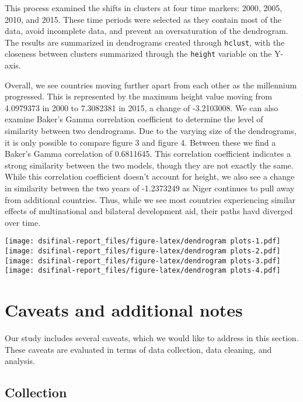 \documentclass[
]{article}
\begin{document}
This process examined the shifts in clusters at four time markers: 2000,
2005, 2010, and 2015. These time periods were selected as they contain
most of the data, avoid incomplete data, and prevent an oversaturation
of the dendrogram. The results are summarized in dendrograms created
through \texttt{hclust}, with the closeness between clusters summarized
through the \texttt{height} variable on the Y-axis.

Overall, we see countries moving further apart from each other as the
millennium progressed. This is represented by the maximum height value
moving from 4.0979373 in 2000 to 7.3082381 in 2015, a change of
-3.2103008. We can also examine Baker's Gamma correlation coefficient to
determine the level of similarity between two dendrograms. Due to the
varying size of the dendrograms, it is only possible to compare figure 3
and figure 4. Between these we find a Baker's Gamma correlation of
0.6811645. This correlation coefficient indicates a strong similarity
between the two models, though they are not exactly the same. While this
correlation coefficient doesn't account for height, we also see a change
in similarity between the two years of -1.2373249 as Niger continues to
pull away from additional countries. Thus, while we see most countries
experiencing similar effects of multinational and bilateral development
aid, their paths havd diverged over time.

\texttt{[image: dsifinal-report\_files/figure-latex/dendrogram plots-1.pdf]}
\texttt{[image: dsifinal-report\_files/figure-latex/dendrogram plots-2.pdf]}
\texttt{[image: dsifinal-report\_files/figure-latex/dendrogram plots-3.pdf]}
\texttt{[image: dsifinal-report\_files/figure-latex/dendrogram plots-4.pdf]}

\hypertarget{caveats-and-additional-notes}{%
\section{Caveats and additional
notes}\label{caveats-and-additional-notes}}

Our study includes several caveats, which we would like to address in
this section. These caveats are evaluated in terms of data collection,
data cleaning, and analysis.

\hypertarget{collection}{%
\subsection{Collection}\label{collection}}
\end{document}
